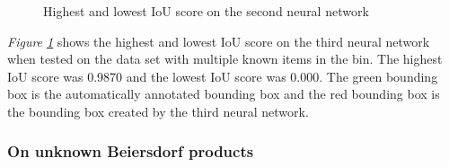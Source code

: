 \begin{figure}[h]
    \centering
    \hspace{0.5cm}
    \caption{Highest and lowest IoU score on the second neural network}
    \label{figure: v3bestworst}
\end{figure}

\textit{Figure \ref{figure: v3bestworst}} shows the highest and lowest IoU score on the third neural network when tested on the data set with multiple known items in the bin. The highest IoU score was 0.9870 and the lowest IoU score was 0.000. The green bounding box is the automatically annotated bounding box and the red bounding box is the bounding box created by the third neural network.



\clearpage
\subsubsection{On unknown Beiersdorf products}\label{subsec:v3resunknownprod}

